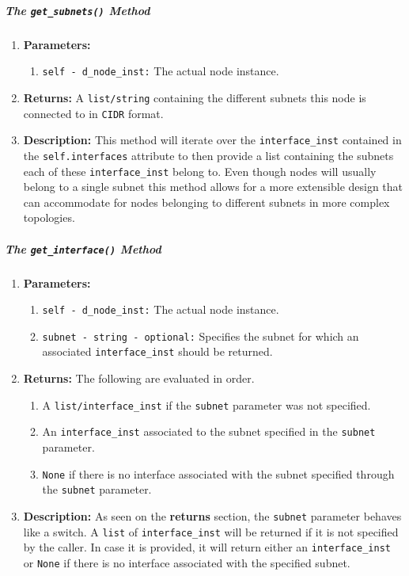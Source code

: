         \subparagraph{The \texttt{get\_subnets()} Method}
            \begin{enumerate}
                \item \textbf{Parameters:}
                \begin{enumerate}
                    \item \texttt{self - d\_node\_inst:} The actual node instance.
                \end{enumerate}
                \item \textbf{Returns:} A \texttt{list/string} containing the different subnets this node is connected to in \texttt{CIDR} format.
                \item \textbf{Description:} This method will iterate over the \texttt{interface\_inst} contained in the \texttt{self.interfaces} attribute to then provide a list containing the subnets each of these \texttt{interface\_inst} belong to. Even though nodes will usually belong to a single subnet this method allows for a more extensible design that can accommodate for nodes belonging to different subnets in more complex topologies.
            \end{enumerate}

        \subparagraph{The \texttt{get\_interface()} Method}
            \begin{enumerate}
                \item \textbf{Parameters:}
                \begin{enumerate}
                    \item \texttt{self - d\_node\_inst:} The actual node instance.
                    \item \texttt{subnet - string - optional:} Specifies the subnet for which an associated \texttt{interface\_inst} should be returned.
                \end{enumerate}
                \item \textbf{Returns:} The following are evaluated in order.
                \begin{enumerate}
                    \item A \texttt{list/interface\_inst} if the \texttt{subnet} parameter was not specified.
                    \item An \texttt{interface\_inst} associated to the subnet specified in the \texttt{subnet} parameter.
                    \item \texttt{None} if there is no interface associated with the subnet specified through the \texttt{subnet} parameter.
                \end{enumerate}
                \item \textbf{Description:} As seen on the \textbf{returns} section, the \texttt{subnet} parameter behaves like a switch. A \texttt{list} of \texttt{interface\_inst} will be returned if it is not specified by the caller. In case it is provided, it will return either an \texttt{interface\_inst} or \texttt{None} if there is no interface associated with the specified subnet.
            \end{enumerate}

